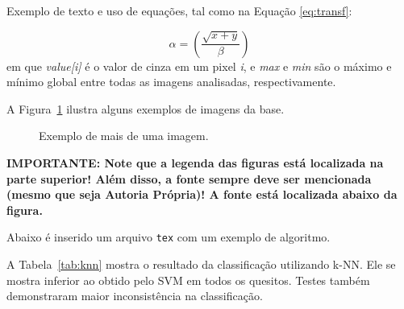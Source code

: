 Exemplo de texto e uso de equações, tal como na Equação \ref{eq:transf}:
 
 \begin{equation}
    \alpha = \left( \dfrac{\sqrt{x+y}}{\beta} \right )
    \label{eq:transf}
\end{equation}
\noindent em que \textit{value[i]} é o valor de cinza em um pixel \textit{i}, e \textit{max} e \textit{min} são o máximo e mínimo global entre todas as imagens analisadas, respectivamente.

A Figura~\ref{fig:exemple02} ilustra alguns exemplos de imagens da base.

 \begin{figure}[!htb]
    \caption{Exemplo de mais de uma imagem.}
    \hfill
    \hfill
     \label{fig:exemple02}
\end{figure}

\textbf{IMPORTANTE: Note que a legenda das figuras está localizada na parte superior! Além disso, a fonte sempre deve ser mencionada (mesmo que seja Autoria Própria)! A fonte está localizada abaixo da figura.}


Abaixo é inserido um arquivo \texttt{tex} com um exemplo de algoritmo. 


A Tabela~\ref{tab:knn} mostra o resultado da classificação utilizando k-NN. Ele se mostra inferior ao obtido pelo SVM em todos os quesitos. Testes também demonstraram maior inconsistência na classificação. 

